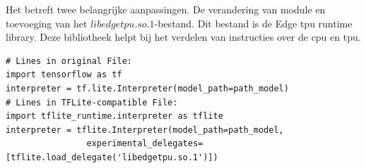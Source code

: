		Het betreft twee belangrijke aanpassingen. De verandering van module en toevoeging van het $libedgetpu.so.1$-bestand. Dit bestand is de Edge \gls{tpu} runtime library. Deze bibliotheek helpt bij het verdelen van instructies over de \gls{cpu} en \gls{tpu}. 

	\begin{lstlisting}[caption={Converteren naar een TFLite-programma.}, captionpos=b,label={lst:TFLconversieprogram}]
# Lines in original File:
import tensorflow as tf
interpreter = tf.lite.Interpreter(model_path=path_model)
# Lines in TFLite-compatible File:
import tflite_runtime.interpreter as tflite
interpreter = tflite.Interpreter(model_path=path_model,
				experimental_delegates=[tflite.load_delegate('libedgetpu.so.1')])
\end{lstlisting}	

		


	
	
	
	
	
	
	
	
	
	
	
	